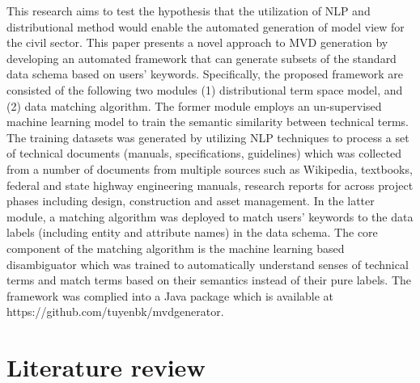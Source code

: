 \documentclass[Journal, InsideFigs, DoubleSpace]{ascelike} %
\begin{document}
This research aims to test the hypothesis that the utilization of NLP and distributional method would enable the automated generation of model view for the civil sector. This paper presents a novel approach to MVD generation by developing an automated framework that can generate subsets of the standard data schema based on users' keywords. Specifically, the proposed framework are consisted of the following two modules (1) distributional term space model, and (2) data matching algorithm. The former module employs an un-supervised machine learning model to train the semantic similarity between technical terms. The training datasets was generated by utilizing NLP techniques to process a set of technical documents (manuals, specifications, guidelines) which was collected from a number of documents from multiple sources such as Wikipedia, textbooks, federal and state highway engineering manuals, research reports for across project phases including design, construction and asset management. In the latter module, a matching algorithm was deployed to match users' keywords to the data labels (including entity and attribute names) in the data schema. The core component of the matching algorithm is the machine learning based disambiguator which was trained to automatically understand senses of technical terms and match terms based on their semantics instead of their pure labels. The framework was complied into a Java package which is available at https://github.com/tuyenbk/mvdgenerator.
%
\section{Literature review} \label{sec:litrev} %
\end{document}
